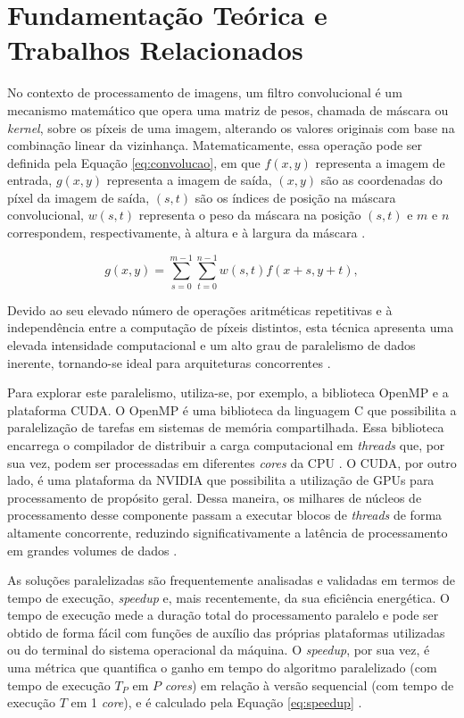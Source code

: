 \documentclass[12pt]{article}
\begin{document}
\section{Fundamentação Teórica e Trabalhos Relacionados}
No contexto de processamento de imagens, um filtro convolucional é um mecanismo matemático que opera uma matriz de pesos, chamada de máscara ou \textit{kernel}, sobre os píxeis de uma imagem, alterando os valores originais com base na combinação linear da vizinhança. Matematicamente, essa operação pode ser definida pela Equação \ref{eq:convolucao}, em que $f(x,y)$ representa a imagem de entrada, $g(x,y)$ representa a imagem de saída, $(x,y)$ são as coordenadas do píxel da imagem de saída, $(s,t)$ são os índices de posição na máscara convolucional, $w(s,t)$ representa o peso da máscara na posição $(s,t)$ e $m$ e $n$ correspondem, respectivamente, à altura e à largura da máscara \cite{gonzalez}.

\begin{equation}
    g(x,y) =
    \sum_{s=0}^{m-1}
    \sum_{t=0}^{n-1}
    w(s,t) f(x+s,y+t),
    \label{eq:convolucao}
\end{equation}

Devido ao seu elevado número de operações aritméticas repetitivas e à independência entre a computação de píxeis distintos, esta técnica apresenta uma elevada intensidade computacional e um alto grau de paralelismo de dados inerente, tornando-se ideal para arquiteturas concorrentes \cite{hwu2023}.

Para explorar este paralelismo, utiliza-se, por exemplo, a biblioteca OpenMP e a plataforma CUDA. O OpenMP é uma biblioteca da linguagem C que possibilita a paralelização de tarefas em sistemas de memória compartilhada. Essa biblioteca encarrega o compilador de distribuir a carga computacional em \textit{threads} que, por sua vez, podem ser processadas em diferentes \textit{cores} da CPU \cite{openMP-paper}. O CUDA, por outro lado, é uma plataforma da NVIDIA que possibilita a utilização de GPUs para processamento de propósito geral. Dessa maneira, os milhares de núcleos de processamento desse componente passam a executar blocos de \textit{threads} de forma altamente concorrente, reduzindo significativamente a latência de processamento em grandes volumes de dados \cite{hwu2023}.

As soluções paralelizadas são frequentemente analisadas e validadas em termos de tempo de execução, \textit{speedup} e, mais recentemente, da sua eficiência energética. O tempo de execução mede a duração total do processamento paralelo e pode ser obtido de forma fácil com funções de auxílio das próprias plataformas utilizadas ou do terminal do sistema operacional da máquina. O \textit{speedup}, por sua vez, é uma métrica que quantifica o ganho em tempo do algoritmo paralelizado (com tempo de execução $T_P$ em $P$ \textit{cores}) em relação à versão sequencial (com tempo de execução $T$ em 1 \textit{core}), e é calculado pela Equação \ref{eq:speedup} \cite{pacheco2011}.
\end{document}
